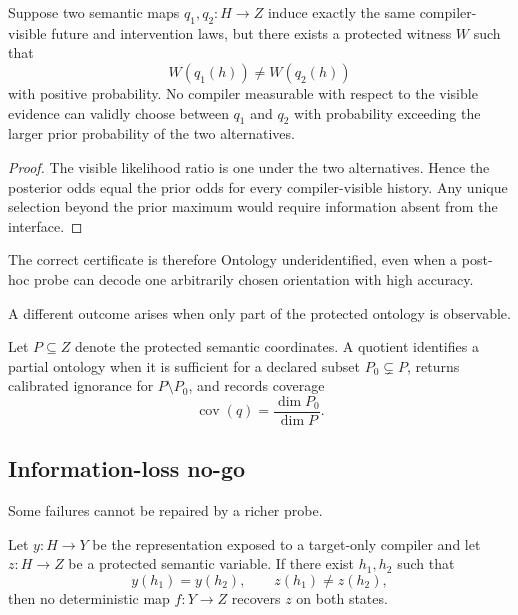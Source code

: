 \begin{theorem}
Suppose two semantic maps $q_1,q_2:H\to Z$ induce exactly the same compiler-visible future and intervention laws, but there exists a protected witness $W$ such that
\begin{equation}
W(q_1(h))\neq W(q_2(h))
\end{equation}
with positive probability.  No compiler measurable with respect to the visible evidence can validly choose between $q_1$ and $q_2$ with probability exceeding the larger prior probability of the two alternatives.
\end{theorem}

\begin{proof}
The visible likelihood ratio is one under the two alternatives.  Hence the posterior odds equal the prior odds for every compiler-visible history.  Any unique selection beyond the prior maximum would require information absent from the interface.
\end{proof}

The correct certificate is therefore Ontology underidentified, even when a post-hoc probe can decode one arbitrarily chosen orientation with high accuracy.

A different outcome arises when only part of the protected ontology is observable.

\begin{definition}
Let $P\subseteq Z$ denote the protected semantic coordinates.  A quotient identifies a partial ontology when it is sufficient for a declared subset $P_0\subsetneq P$, returns calibrated ignorance for $P\setminus P_0$, and records coverage
\begin{equation}
\operatorname{cov}(q)=\frac{\dim P_0}{\dim P}.
\end{equation}
\end{definition}

\subsection{Information-loss no-go}

Some failures cannot be repaired by a richer probe.

\begin{theorem}
Let $y:H\to Y$ be the representation exposed to a target-only compiler and let $z:H\to Z$ be a protected semantic variable.  If there exist $h_1,h_2$ such that
\begin{equation}
y(h_1)=y(h_2),
\qquad
z(h_1)\neq z(h_2),
\label{eq:b23-collision}
\end{equation}
then no deterministic map $f:Y\to Z$ recovers $z$ on both states.
\end{theorem}

